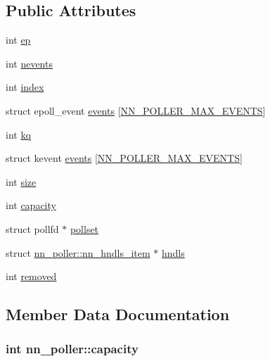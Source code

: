 \subsection*{Public Attributes}
\begin{DoxyCompactItemize}
\item 
int \hyperlink{structnn__poller_af927ff1ee0aabc2380bb1f5294c7aec2}{ep}
\item 
int \hyperlink{structnn__poller_afb554c7c16ed86202143b7b9edb0e810}{nevents}
\item 
int \hyperlink{structnn__poller_aeca31ffaf2a580f98fc8c727f8a3fa3b}{index}
\item 
struct epoll\+\_\+event \hyperlink{structnn__poller_a2e305f681cba77febc1864f249de5192}{events} \mbox{[}\hyperlink{poller__kqueue_8h_aaeb4a27a8666be4693e5626046f809b0}{N\+N\+\_\+\+P\+O\+L\+L\+E\+R\+\_\+\+M\+A\+X\+\_\+\+E\+V\+E\+N\+TS}\mbox{]}
\item 
int \hyperlink{structnn__poller_a2c791ee1963160c78f0e69f87c520618}{kq}
\item 
struct kevent \hyperlink{structnn__poller_a832e2b68ccf516c6db96c42ec37c65a7}{events} \mbox{[}\hyperlink{poller__kqueue_8h_aaeb4a27a8666be4693e5626046f809b0}{N\+N\+\_\+\+P\+O\+L\+L\+E\+R\+\_\+\+M\+A\+X\+\_\+\+E\+V\+E\+N\+TS}\mbox{]}
\item 
int \hyperlink{structnn__poller_ab898f454acc5a9cb9a6133e2273e753a}{size}
\item 
int \hyperlink{structnn__poller_abb25f431598ab8cf0e6245b7a39a4b74}{capacity}
\item 
struct pollfd $\ast$ \hyperlink{structnn__poller_ab8868a38e93b921fdc9822e4ee4bae38}{pollset}
\item 
struct \hyperlink{structnn__poller_1_1nn__hndls__item}{nn\+\_\+poller\+::nn\+\_\+hndls\+\_\+item} $\ast$ \hyperlink{structnn__poller_a4eed53b9b6ece7d8dfbc96bc80f988ce}{hndls}
\item 
int \hyperlink{structnn__poller_a6db22cb59d715d1afdf008cf58c3d419}{removed}
\end{DoxyCompactItemize}


\subsection{Member Data Documentation}
\subsubsection[{capacity}]{\setlength{\rightskip}{0pt plus 5cm}int nn\+\_\+poller\+::capacity}\hypertarget{structnn__poller_abb25f431598ab8cf0e6245b7a39a4b74}{}\label{structnn__poller_abb25f431598ab8cf0e6245b7a39a4b74}
